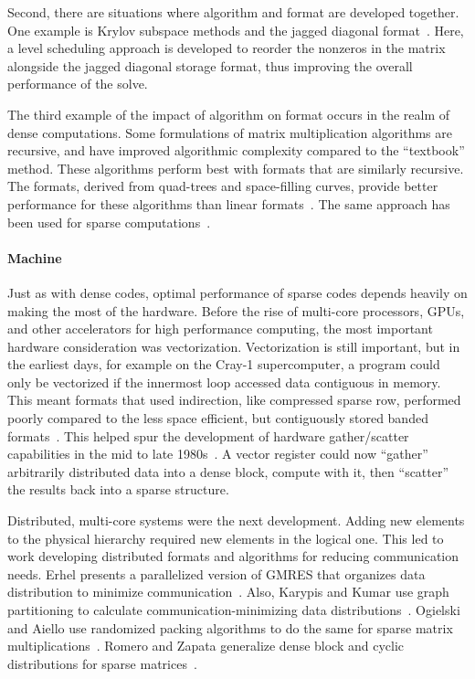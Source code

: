 Second, there are situations where algorithm and format are developed together.
One example is Krylov subspace methods and the jagged diagonal format~\cite{saad1989krylov,montagne2004optimal}.
Here, a level scheduling approach is developed to reorder the nonzeros in the matrix alongside the jagged diagonal storage format, thus improving the overall performance of the solve.

The third example of the impact of algorithm on format occurs in the realm of dense computations.
Some formulations of matrix multiplication algorithms are recursive, and have improved algorithmic complexity compared to the ``textbook'' method.
These algorithms perform best with formats that are similarly recursive.
The formats, derived from quad-trees and space-filling curves, provide better performance for these algorithms than linear formats~\cite{chatterjee1999recursive,chatterjee1999nonlinear}.
The same approach has been used for sparse computations~\cite{alappat2020recursive,martone2010utilizing,yzelman2012cache,haase2007hilbert}.


\paragraph{Machine}

Just as with dense codes, optimal performance of sparse codes depends heavily on making the most of the hardware.
Before the rise of multi-core processors, GPUs, and other accelerators for high performance computing, the most important hardware consideration was vectorization.
Vectorization is still important, but in the earliest days, for example on the Cray-1 supercomputer, a program could only be vectorized if the innermost loop accessed data contiguous in memory.
This meant formats that used indirection, like compressed sparse row, performed poorly compared to the less space efficient, but contiguously stored banded formats~\cite{duff1982experience}.
This helped spur the development of hardware gather/scatter capabilities in the mid to late 1980s~\cite{cleveland1987progress}.
A vector register could now \enquote{gather} arbitrarily distributed data into a dense block, compute with it, then \enquote{scatter} the results back into a sparse structure. 

Distributed, multi-core systems were the next development.
Adding new elements to the physical hierarchy required new elements in the logical one.
This led to work developing distributed formats and algorithms for reducing communication needs.
Erhel presents a parallelized version of GMRES that organizes data distribution to minimize communication~\cite{erhel1995parallel}.
Also, Karypis and Kumar use graph partitioning to calculate communication-minimizing data distributions~\cite{karypis1998parallel}.
Ogielski and Aiello use randomized packing algorithms to do the same for sparse matrix multiplications~\cite{ogielski1993sparse}.
Romero and Zapata generalize dense block and cyclic distributions for sparse matrices~\cite{romero1995data}.


